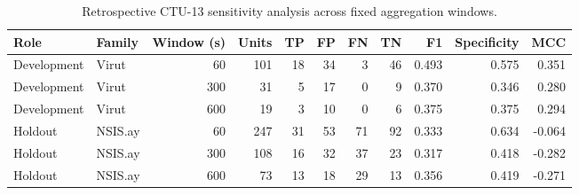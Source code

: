 \begin{table}[htbp]
\centering
\caption{Retrospective CTU-13 sensitivity analysis across fixed aggregation windows.}
\label{tab:ctu13-windows}
\small
\begin{adjustbox}{max width=\textwidth}
\begin{tabular}{llrrrrrrrrr}
\toprule
Role & Family & Window (s) & Units & TP & FP & FN & TN & F1 & Specificity & MCC \\
\midrule
Development & Virut & 60 & 101 & 18 & 34 & 3 & 46 & 0.493 & 0.575 & 0.351 \\
Development & Virut & 300 & 31 & 5 & 17 & 0 & 9 & 0.370 & 0.346 & 0.280 \\
Development & Virut & 600 & 19 & 3 & 10 & 0 & 6 & 0.375 & 0.375 & 0.294 \\
Holdout & NSIS.ay & 60 & 247 & 31 & 53 & 71 & 92 & 0.333 & 0.634 & -0.064 \\
Holdout & NSIS.ay & 300 & 108 & 16 & 32 & 37 & 23 & 0.317 & 0.418 & -0.282 \\
Holdout & NSIS.ay & 600 & 73 & 13 & 18 & 29 & 13 & 0.356 & 0.419 & -0.271 \\
\bottomrule
\end{tabular}
\end{adjustbox}
\par{}
\par{}
\end{table}
